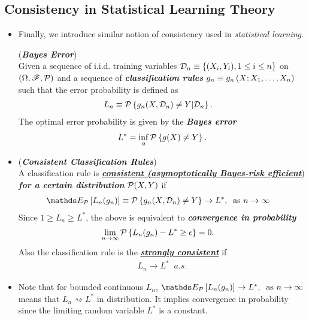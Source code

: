 \documentclass[11pt]{article}
\begin{document}
\subsection{Consistency in Statistical Learning Theory}
\begin{itemize}
\item Finally, we introduce similar notion of consistency used in \emph{statistical learning}. 
\begin{definition} (\emph{\textbf{Bayes Error}}) \citep{devroye2013probabilistic}\\
Given a sequence of i.i.d. training variables ${\mathcal D}_{n}\equiv \left\{(X_{i}, Y_{i}), 1\le i\le n\right\}$ on $(\Omega, {\mathscr F}, {\mathcal P})$  and a sequence of \emph{\textbf{classification rules}} $g_{n}\equiv g_{n}\left(X; X_{1}, \ldots, X_{n}\right)$ such that the error probability is defined as
\begin{align*}
L_{n}&\equiv {\mathcal P}\left\{ g_{n}(X, {\mathcal D}_{n})\neq Y | {\mathcal D}_{n} \right\}.
\end{align*} The optimal error probability is given by the \emph{\textbf{Bayes error}}
\begin{align*}
L^{*}= \inf_{g}{\mathcal P}\left\{g(X)\neq Y\right\}.
\end{align*}
\end{definition}

\item 
\begin{definition} (\emph{\textbf{Consistent Classification Rules}})\\
A classification rule is \underline{\emph{\textbf{consistent (asymoptotically Bayes-risk efficient}}}) \emph{\textbf{for a certain distribution}} ${\mathcal P}(X,Y)$ if 
\begin{align*}
\E{\cP}{L_{n}(g_{n})}&\equiv \cP\set{ g_{n}(X, \cD_{n})\neq Y } \rightarrow L^{*},\;\; \text{as } n\rightarrow \infty
\end{align*}
Since $1\ge L_{n} \ge  L^{*}$, the above is equivalent to \emph{\textbf{convergence in probability}} 
\begin{align*}
\lim\limits_{n\rightarrow \infty}{\mathcal P}\left\{ L_{n}(g_{n}) - L^{*}\ge \epsilon \right\}&= 0.
\end{align*}
Also the classification rule is the \underline{\emph{\textbf{strongly consistent}}} if 
\begin{align*}
L_{n} \rightarrow L^{*} \;\; a.s.
\end{align*}
\end{definition}

\item \begin{remark}
Note that for bounded continuous $L_{n}$, $\E{\cP}{L_{n}(g_{n})}\rightarrow L^{*},\;\; \text{as } n\rightarrow \infty$ means that $L_{n}\rightsquigarrow L^{*}$ in distribution. It implies convergence in probability since the limiting random variable $L^{*}$ is a constant.
\end{remark}


\end{itemize}
\end{document}
